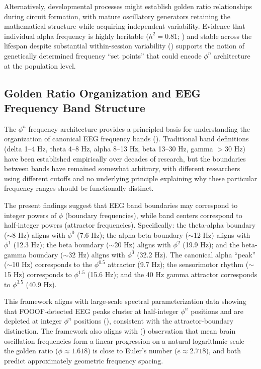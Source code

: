 \documentclass[11pt,a4paper]{article}
\begin{document}
Alternatively, developmental processes might establish golden ratio relationships during circuit formation, with mature oscillatory generators retaining the mathematical structure while acquiring independent variability. Evidence that individual alpha frequency is highly heritable ($h^2 = 0.81$; \cite{smit2006heritability, posthuma2001heritability}) and stable across the lifespan despite substantial within-session variability (\cite{grandy2013individual}) supports the notion of genetically determined frequency ``set points'' that could encode $\phi^n$ architecture at the population level.

\subsection{Golden Ratio Organization and EEG Frequency Band Structure}

The $\phi^n$ frequency architecture provides a principled basis for understanding the organization of canonical EEG frequency bands (\cite{klimesch1999eeg}). Traditional band definitions (delta 1–4 Hz, theta 4–8 Hz, alpha 8–13 Hz, beta 13–30 Hz, gamma $>$30 Hz) have been established empirically over decades of research, but the boundaries between bands have remained somewhat arbitrary, with different researchers using different cutoffs and no underlying principle explaining why these particular frequency ranges should be functionally distinct.

The present findings suggest that EEG band boundaries may correspond to integer powers of $\phi$ (boundary frequencies), while band centers correspond to half-integer powers (attractor frequencies). Specifically: the theta-alpha boundary ($\sim$8 Hz) aligns with $\phi^0$ (7.6 Hz); the alpha-beta boundary ($\sim$12 Hz) aligns with $\phi^1$ (12.3 Hz); the beta boundary ($\sim$20 Hz) aligns with $\phi^2$ (19.9 Hz); and the beta-gamma boundary ($\sim$32 Hz) aligns with $\phi^3$ (32.2 Hz). The canonical alpha ``peak'' ($\sim$10 Hz) corresponds to the $\phi^{0.5}$ attractor (9.7 Hz); the sensorimotor rhythm ($\sim$15 Hz) corresponds to $\phi^{1.5}$ (15.6 Hz); and the 40 Hz gamma attractor corresponds to $\phi^{3.5}$ (40.9 Hz).

This framework aligns with large-scale spectral parameterization data showing that FOOOF-detected EEG peaks cluster at half-integer $\phi^n$ positions and are depleted at integer $\phi^n$ positions (\cite{donoghue2020fooof}), consistent with the attractor-boundary distinction. The framework also aligns with (\citet{buzsaki2004neuronal}) observation that mean brain oscillation frequencies form a linear progression on a natural logarithmic scale—the golden ratio ($\phi \approx 1.618$) is close to Euler's number ($e \approx 2.718$), and both predict approximately geometric frequency spacing.
\end{document}
